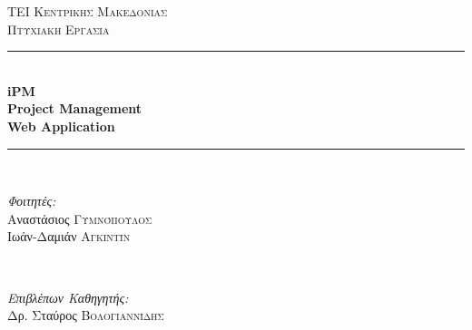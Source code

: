 \begin{titlepage}

\newcommand{\HRule}{\rule{\linewidth}{0.25mm}}

\center
 

\textsc{\LARGE \textgreek{\color{maroon}ΤΕΙ Κεντρικής Μακεδονίας}}\\[1cm] 
\textsc{\large \textgreek{Πτυχιακή Εργασία}}\\[0.5cm] 

\HRule \\[0.4cm]
{ \huge \bfseries {iPM \\ Project Management \\Web Application}}\\[0.4cm]
\HRule \\[1.5cm]
 
\begin{minipage}{0.4\textwidth}
    \begin{flushleft}\large
    \emph{Φοιτητές:}\\
    \color{maroon}Αναστάσιος \textsc{\color{maroon}Γυμνόπουλος}\\
    \color{maroon}Ιωάν-Δαμιάν \textsc{\color{maroon}Αγκιντίν}
    \end{flushleft}
\end{minipage}
~
\begin{minipage}{0.4\textwidth}
    \begin{flushright}\large
    \emph{Επιβλέπων Καθηγητής:} \\
    \color{maroon}Δρ. Σταύρος \textsc{\color{maroon}Βολογιαννίδης}
    \end{flushright}
\end{minipage}\\[3cm]




\end{titlepage}
